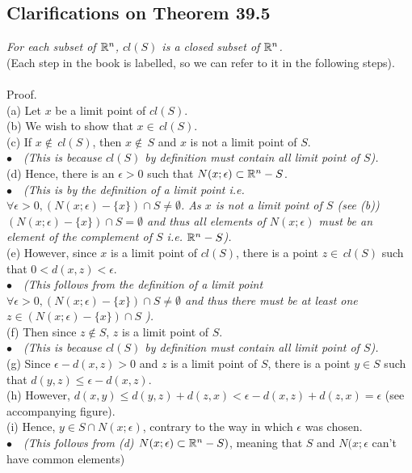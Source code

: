 \subsection*{Clarifications on Theorem 39.5}
\textit{For each subset of $\mathbb{R}^n$, $cl (S)$ is a closed subset of $\mathbb{R}^n$.}\\
(Each step in the book is labelled, so we can refer to it in the following steps).\\\\
Proof. \\
(a) Let $x$ be a limit point of $cl (S)$. \\
(b) We wish to show that $x \in \, cl (S)$.\\
(c) If $x \not \in \, cl (S)$, then $x \not \in \, S$ and $x$ is not a limit point of $S$.\\
    \textit{$\bullet\quad$(This is because $cl(S)$ by definition must contain all limit point of $S$).}\\
(d) Hence, there is an $\epsilon  > 0$
such that $N(x; \epsilon)\subset \mathbb{R}^n- S$. \\
\textit{$\bullet\quad$(This is by the definition of a limit point i.e. $\forall\epsilon>0, (N(x; \epsilon)-\{x\})\cap S\neq \emptyset$. As $x$ is not a limit point of $S$ (see (b)) $(N(x; \epsilon)-\{x\})\cap S= \emptyset$ and thus all elements of $N(x; \epsilon)$ must be an element of the complement of $S$ i.e. $\mathbb{R}^n-S$).}\\
(e) However, since $x$ is a limit point of $cl (S)$, there is a
point $z \in \,  cl (S)$ such that $0 < d(x, z) < \epsilon$.\\
\textit{$\bullet\quad$(This follows from the definition of a limit point $\forall\epsilon>0, (N(x; \epsilon)-\{x\})\cap S\neq \emptyset$ and thus there must be at least one $z\in(N(x; \epsilon)-\{x\})\cap S$ ).}\\
(f) Then since $z\not\in S$, $z$ is a limit point of $S$.\\
\textit{$\bullet\quad$(This is because $cl(S)$ by definition must contain all limit point of $S$).}\\
(g) Since $\epsilon - d(x, z) > 0$ and $z$ is a limit point of $S$, there is a point $y\in S$ such that
$d(y, z) \leq  \epsilon - d(x, z)$.\\
(h) However, $d(x, y) \leq d(y, z) + d(z, x) < \epsilon - d(x, z) +d(z, x) = \epsilon$ (see accompanying figure).\\
(i) Hence, $y\in S\cap N(x;\epsilon)$, contrary to the way in which $\epsilon$ was chosen.
\\
\textit{$\bullet\quad$(This follows from (d) $N(x; \epsilon)\subset \mathbb{R}^n- S)$}, meaning that $S$ and $N(x; \epsilon$ can't have common elements)\\
\newpage

